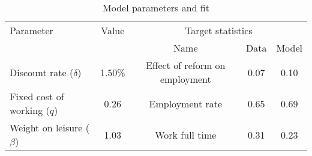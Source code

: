 \begin{table}[htbp]\caption{Model parameters and fit}\label{table:model_param}\centering\footnotesize\begin{tabular}{lcccc} \toprule  Parameter & Value & \multicolumn{3}{c}{Target statistics}  \\\cline{3-5}  &  &  Name & Data & Model  \\\midrule    Discount rate ($\delta$)      &1.50\%& Effect of reform on employment   & 0.07 &0.10\\ Fixed cost of working ($q$)   &0.26& Employment rate                  & 0.65 &0.69\\ Weight on leisure ($\beta$)   &1.03& Work full time             & 0.31 &0.23\\  \bottomrule\end{tabular}\end{table}